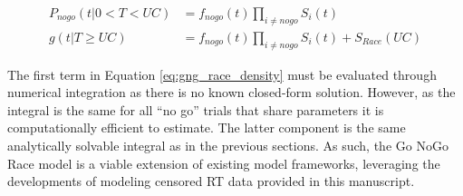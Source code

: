 \documentclass[12pt,a4paper,one side]{article}
\begin{document}
\begin{align}
    P_{nogo}(t|0 < T < UC)  &= f_{nogo}(t) \prod_{i \neq nogo} S_i(t) \\
    g(t|T \geq UC) &= f_{nogo}(t) \prod_{i \neq nogo} S_i(t) + S_{Race}(UC)
    \label{eq:gng_race_density}
\end{align}

The first term in Equation \ref{eq:gng_race_density} must be evaluated through numerical integration \parencite[see e.g.,][]{brown2008simplest} as there is no known closed-form solution. However, as the integral is the same for all ``no go'' trials that share parameters it is computationally efficient to estimate. The latter component is the same analytically solvable integral as in the previous sections. As such, the Go NoGo Race model is a viable extension of existing model frameworks, leveraging the developments of modeling censored RT data provided in this manuscript.


\printbibliography
\clearpage
\end{document}
